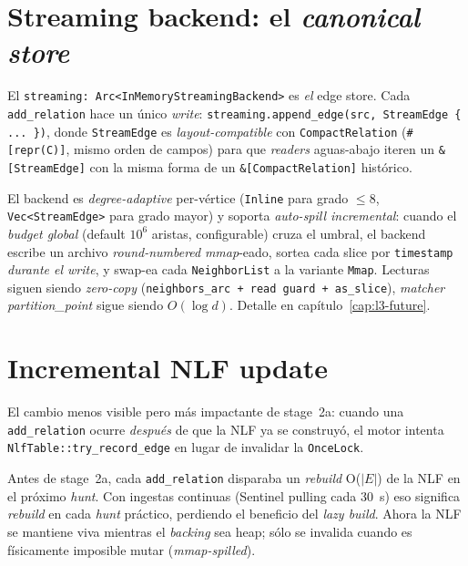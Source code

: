 \section{Streaming backend: el \emph{canonical store}}

El \texttt{streaming: Arc<InMemoryStreamingBackend>} es \emph{el} edge
store. Cada \texttt{add\_relation} hace un único \emph{write}:
\texttt{streaming.append\_edge(src, StreamEdge \{ ... \})}, donde
\texttt{StreamEdge} es \emph{layout-compatible} con
\texttt{CompactRelation} (\texttt{\#[repr(C)]}, mismo orden de campos)
para que \emph{readers} aguas-abajo iteren un \texttt{\&[StreamEdge]}
con la misma forma de un \texttt{\&[CompactRelation]} histórico.

El backend es \emph{degree-adaptive} per-vértice (\texttt{Inline} para
grado $\leq 8$, \texttt{Vec<StreamEdge>} para grado mayor) y soporta
\emph{auto-spill incremental}: cuando el \emph{budget global}
(default $10^6$ aristas, configurable) cruza el umbral, el backend
escribe un archivo \emph{round-numbered} \emph{mmap}-eado, sortea cada
slice por \texttt{timestamp} \emph{durante el write}, y swap-ea cada
\texttt{NeighborList} a la variante \texttt{Mmap}. Lecturas siguen
siendo \emph{zero-copy} (\texttt{neighbors\_arc + read guard +
as\_slice}), \emph{matcher partition\_point} sigue siendo \(O(\log d)\).
Detalle en capítulo~\ref{cap:l3-future}.

\section{Incremental NLF update}

El cambio menos visible pero más impactante de stage~2a: cuando una
\texttt{add\_relation} ocurre \emph{después} de que la NLF ya se
construyó, el motor intenta \texttt{NlfTable::try\_record\_edge} en
lugar de invalidar la \texttt{OnceLock}.

\begin{algorithm}[H]
\caption{Incremental NLF update en \texttt{add\_relation}}
\end{algorithm}

\begin{intuicion}
Antes de stage~2a, cada \texttt{add\_relation} disparaba un
\emph{rebuild} O($|E|$) de la NLF en el próximo \emph{hunt}. Con
ingestas continuas (Sentinel pulling cada 30~s) eso significa
\emph{rebuild} en cada \emph{hunt} práctico, perdiendo el beneficio
del \emph{lazy build}. Ahora la NLF se mantiene viva mientras el
\emph{backing} sea heap; sólo se invalida cuando es físicamente
imposible mutar (\emph{mmap-spilled}).
\end{intuicion}
